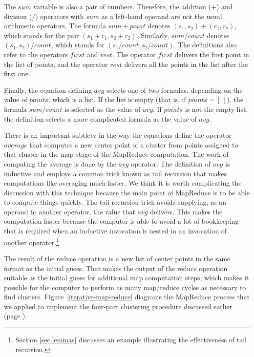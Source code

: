 The $sum$ variable is also a pair of numbers.
Therefore, the addition ($+$) and division ($/$) operators
with $sum$ as a left-hand operand are not the usual arithmetic operators.
The formula $sum + point$ denotes $(s_1, s_2) + (r_1,r_2)$,
which stands for the pair $(s_1+r_1, s_2+r_2)$.
Similarly, $sum/count$ denotes $(s_1,s_2)/count$,
which stands for $(s_1/count, s_2/count)$.
The definitions also refer to the operators $first$ and $rest$.
The operator $first$ delivers the first point in the list of points,
and the operator $rest$ delivers all the points in the list
after the first one.

Finally, the equation defining $avg$ selects one of two formulas,
depending on the value of $points$, which is a list.
If the list is empty (that is, if $points = [~]$),
the formula $sum/count$ is selected as the value of $avg$.
If $points$ is not the empty list, the definition selects
a more complicated formula as the value of $avg$.

There is an important subtlety in the way the equations define
the operator $average$ that computes a new center point of a cluster
from points assigned to that cluster in the map stage of the
MapReduce computation.
The work of computing the average is done by the $avg$ operator.
The definition of $avg$ is inductive and
employs a common trick known as tail recursion
that makes computations like averaging much faster.
We think it is worth complicating the discussion
with this technique because the main point
of MapReduce is to be able to compute things quickly.
The tail recursion
trick avoids supplying, as an operand to another operator,
the value that $avg$ delivers.
This makes the computation
faster because the computer is able to avoid a lot of bookkeeping
that is required when an inductive
invocation is nested in an invocation of another
operator.\footnote{Section \ref{sec:lemmas} discusses an
example illustrating the effectiveness of tail recursion.}

The result of the reduce operation is a new list of center points
in the same format as the initial guess.
That makes the output of the
reduce operation suitable as
the initial guess for additional map computation steps,
which makes it possible for the computer to perform as many
map/reduce cycles as necessary to find clusters.
Figure~\ref{iterative-map-reduce} diagrams the MapReduce
process that we applied to implement the four-part clustering procedure
discussed earlier (page \pageref{cluster-process}).

